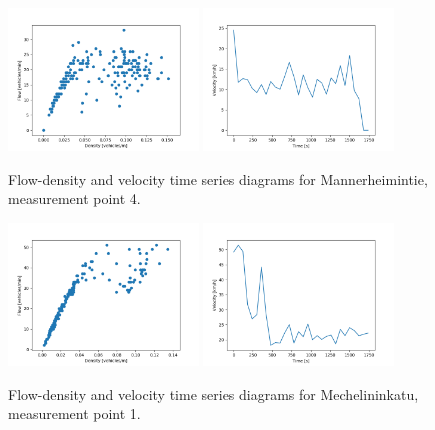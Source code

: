 \documentclass[english, 12pt, a4paper, elec, utf8, pdfa, online]{aaltothesis}
\begin{document}
\clearpage
\begin{figure}[ht!]
    \centering
    \includegraphics[width=0.45\textwidth]{graphs/Mannerheimintie_4_flw_dns.png}
    \includegraphics[width=0.45\textwidth]{graphs/Mannerheimintie_4_spd_time_6.png}
    \caption{Flow-density and velocity time series diagrams for Mannerheimintie, measurement point 4.}
\end{figure}
\begin{figure}[ht!]
    \centering
    \includegraphics[width=0.45\textwidth]{graphs/Mechelininkatu_1_flw_dns.png}
    \includegraphics[width=0.45\textwidth]{graphs/Mechelininkatu_1_spd_time_6.png}
    \caption{Flow-density and velocity time series diagrams for Mechelininkatu, measurement point 1.}
\end{figure}
\end{document}
